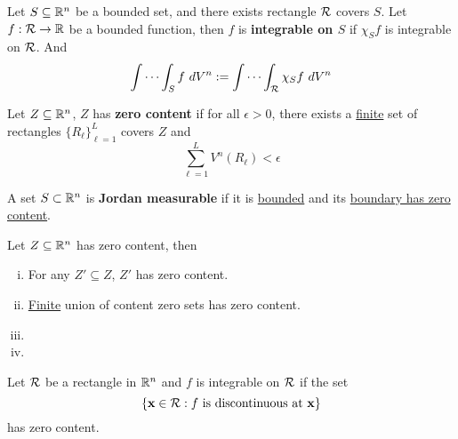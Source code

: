 \documentclass[11pt]{article}
\begin{document}
			\begin{definition}
				Let $S \subseteq \mathbb{R}^n$ be a bounded set, and there exists rectangle $\mathcal{{R}}$ covers $S$. Let $f: \mathcal{{R}} \to \mathbb{R}$ be a bounded function, then $f$ is \textbf{integrable on $S$} if $\chi_S f$ is integrable on $\mathcal{{R}}$. And
				\begin{equation}
					\int \cdots \int_S f\ dV^n := \int \cdots \int_{\mathcal{{R}}} \chi_S f\ dV^n
				\end{equation}
			\end{definition}
			
			\begin{definition}
				Let $Z \subseteq \mathbb{R}^n$, $Z$ has \textbf{zero content} if for all $\epsilon > 0$, there exists a \ul{finite} set of rectangles $\{R_\ell\}_{\ell=1}^L$ covers $Z$ and
				\begin{equation}
					\sum_{\ell=1}^L V^n (R_\ell) < \epsilon
				\end{equation}
			\end{definition}
			
			\begin{definition}
				A set $S \subset \mathbb{R}^n$ is \textbf{Jordan measurable} if it is \ul{bounded} and its \ul{boundary has zero content}.
			\end{definition}
			
			\begin{proposition}
				Let $Z \subseteq \mathbb{R}^n$ has zero content, then
				\begin{enumerate}[(i)]
					\item For any $Z' \subseteq Z$, $Z'$ has zero content.
					\item \ul{Finite} union of content zero sets has zero content.
					\item {}
					\item {}
				\end{enumerate}
			\end{proposition}
			
			\begin{theorem}
				Let $\mathcal{{R}}$ be a rectangle in $\mathbb{R}^n$ and $f$ is integrable on $\mathcal{{R}}$ if the set
				\begin{equation}
					\{\textbf{x} \in \mathcal{{R}}: f \text{{ is discontinuous at \textbf{x}}}\}
				\end{equation}
				has zero content.
			\end{theorem}
			
\end{document}
